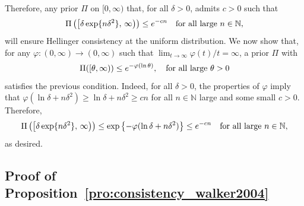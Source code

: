 \documentclass[11pt,twoside]{article}
\def\NN{\mathbb{N}}
\begin{document}
Therefore, any prior $\Pi$ on $[0,\infty)$ that, for all $\delta>0$, admits $c>0$ such that
%
\begin{equation*}
    \Pi\left(\left[\delta \exp\{n\delta^2\}, \, \infty\right)\right) \leq e^{-cn} \quad \textnormal{for all large } n\in\NN,
\end{equation*}
%
will ensure Hellinger consistency at the uniform distribution. We now show that, for any $\varphi :(0, \infty) \to (0,\infty)$ such that $\lim_{t\to\infty} \varphi(t)/t = \infty$, a prior $\Pi$ with
%
\begin{equation*}
    \Pi([\theta, \infty)) \leq e^{-\varphi(\ln \theta)}, \quad 
    \textnormal{for all large } \theta>0
\end{equation*}
%
satisfies the previous condition. Indeed, for all $\delta>0$, the properties of $\varphi$ imply that $\varphi(\ln\delta + n\delta^2) \geq \ln\delta + n\delta^2 \geq c n$ for all $n\in\NN$ large and some small $c>0$. Therefore,
%
\begin{equation*}
    \Pi\left(\left[\delta \exp\{n\delta^2\}, \, \infty\right)\right) \leq \exp\left\{-\varphi(\ln \delta + n\delta^2)\right\} \leq e^{-cn} \quad \textnormal{for all large } n\in\NN,
\end{equation*}
%
as desired.



\subsection*{Proof of Proposition~\ref{pro:consistency_walker2004}}%
\end{document}
